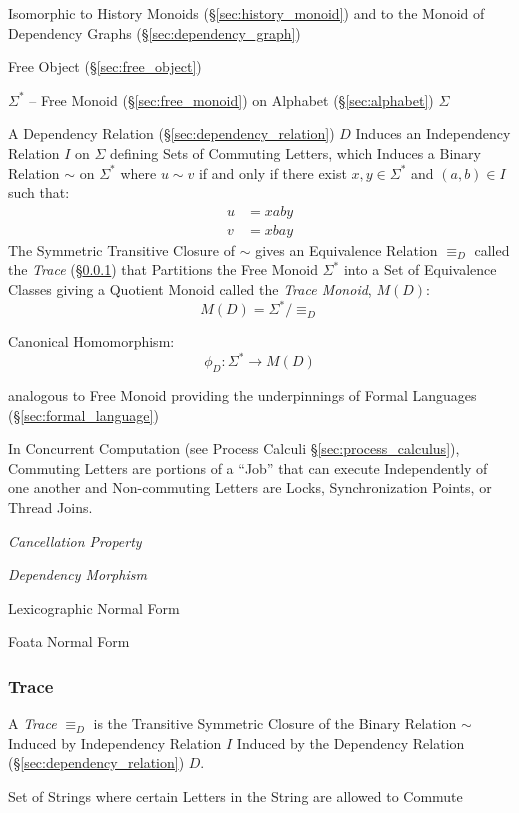 Isomorphic to History Monoids (\S\ref{sec:history_monoid}) and to the
Monoid of Dependency Graphs (\S\ref{sec:dependency_graph})

Free Object (\S\ref{sec:free_object})

$\Sigma^*$ -- Free Monoid (\S\ref{sec:free_monoid}) on Alphabet
(\S\ref{sec:alphabet}) $\Sigma$

A Dependency Relation (\S\ref{sec:dependency_relation}) $D$ Induces an
Independency Relation $I$ on $\Sigma$ defining Sets of Commuting
Letters, which Induces a Binary Relation $\sim$ on $\Sigma^*$ where $u
\sim v$ if and only if there exist $x,y \in \Sigma^*$ and $(a,b) \in
I$ such that:
\begin{align*}
  u &= xaby \\
  v &= xbay
\end{align*}
The Symmetric Transitive Closure of $\sim$ gives an Equivalence
Relation $\equiv_D$ called the \emph{Trace} (\S\ref{sec:trace}) that
Partitions the Free Monoid $\Sigma^*$ into a Set of Equivalence
Classes giving a Quotient Monoid called the \emph{Trace Monoid},
$M(D)$:
\[
  M(D) = \Sigma^*/\equiv_D
\]

Canonical Homomorphism:
\[
  \phi_D : \Sigma^* \rightarrow M(D)
\]

analogous to Free Monoid providing the underpinnings of Formal
Languages (\S\ref{sec:formal_language})

In Concurrent Computation (see Process Calculi
\S\ref{sec:process_calculus}), Commuting Letters are portions of a
``Job'' that can execute Independently of one another and
Non-commuting Letters are Locks, Synchronization Points, or Thread
Joins. %

\emph{Cancellation Property}

\emph{Dependency Morphism}

Lexicographic Normal Form

Foata Normal Form



\subsubsection{Trace}\label{sec:trace}

A \emph{Trace} $\equiv_D$ is the Transitive Symmetric Closure of the
Binary Relation $\sim$ Induced by Independency Relation $I$ Induced by
the Dependency Relation (\S\ref{sec:dependency_relation}) $D$.

Set of Strings where certain Letters in the String are allowed to
Commute



